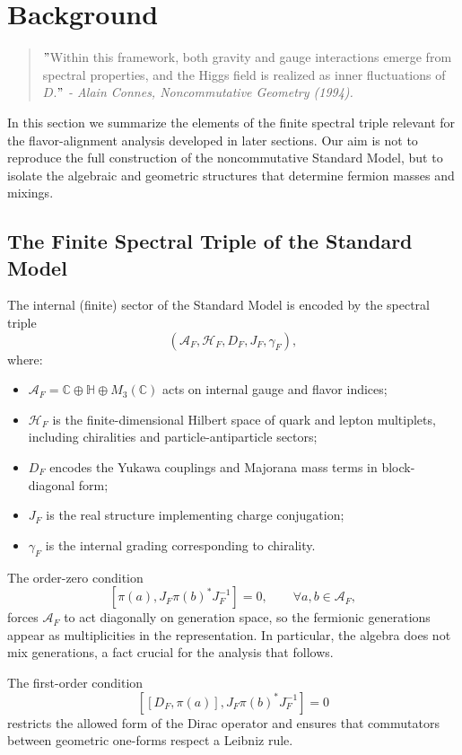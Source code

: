 \section{Background}

\begin{quote}
\("\)Within this framework, both gravity and gauge interactions emerge from spectral properties, and the Higgs field is realized as inner fluctuations of $D$.\("\)
\emph{- Alain Connes, Noncommutative Geometry (1994).}
\end{quote}

In this section we summarize the elements of the finite spectral triple relevant for the flavor-alignment analysis developed in later sections. Our aim is not to reproduce the full construction of the noncommutative Standard Model, but to isolate the algebraic and geometric structures that determine fermion masses and mixings.

\subsection{The Finite Spectral Triple of the Standard Model}

The internal (finite) sector of the Standard Model is encoded by the spectral triple
\[
(\mathcal A_F,\mathcal H_F,D_F,J_F,\gamma_F),
\]
where:
\begin{itemize}
\item $\mathcal A_F=\mathbb C \oplus \mathbb H \oplus M_3(\mathbb C)$ acts on internal gauge and flavor indices;
\item $\mathcal H_F$ is the finite-dimensional Hilbert space of quark and lepton multiplets, including chiralities and particle-antiparticle sectors;
\item $D_F$ encodes the Yukawa couplings and Majorana mass terms in block-diagonal form;
\item $J_F$ is the real structure implementing charge conjugation;
\item $\gamma_F$ is the internal grading corresponding to chirality.
\end{itemize}

The order-zero condition
\[
[\pi(a),J_F \pi(b)^* J_F^{-1}] = 0,\qquad \forall a,b\in\mathcal A_F,
\]
forces $\mathcal A_F$ to act diagonally on generation space, so the fermionic generations appear as multiplicities in the representation. In particular, the algebra does not mix generations, a fact crucial for the analysis that follows.

The first-order condition
\[
[[D_F,\pi(a)],J_F\pi(b)^*J_F^{-1}] = 0
\]
restricts the allowed form of the Dirac operator and ensures that commutators between geometric one-forms respect a Leibniz rule.

